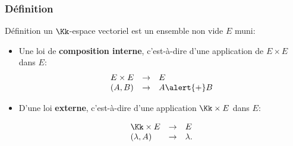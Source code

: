 \documentclass[dvipsnames]{beamer}
\begin{document}
\begin{frame}[<+->]
  \frametitle{Définition}
 
  \begin{block}{Définition}
    \small
    un \alert{$\Kk$-espace vectoriel}  est un ensemble non vide $E$ muni:

    \begin{itemize}
      \scriptsize
      \item Une loi de \textbf{composition interne}, c'est-à-dire
        d'une application de $E \times E$ dans $E$:
        $$
        \begin{array}{lcl}
          E\times E & \rightarrow & E\\
          (A, B)&   \rightarrow & A \alert{\mathbf{+}} B
        \end{array}
        $$
      \item D'une loi \textbf{externe}, c'est-à-dire d'une application
        $\Kk\times E$ dans $E$:

        $$
        \begin{array}{lcl}
          \mathbf{\Kk}\times E & \rightarrow & E\\
          (\lambda, A)&   \rightarrow & \lambda \mathbf{.} 
        \end{array}
$$
    \end{itemize}
  \end{block}
\end{frame}
\end{document}
